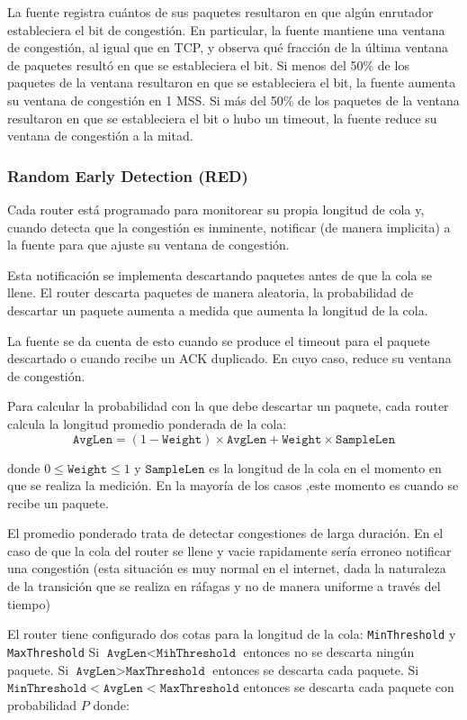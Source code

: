 La fuente registra cuántos de sus paquetes resultaron en que algún enrutador estableciera el bit de congestión. En particular, la fuente mantiene una ventana de congestión, al igual que en TCP, y observa qué fracción de la última ventana de paquetes resultó en que se estableciera el bit. Si menos del 50\% de los paquetes de la ventana resultaron en que se estableciera el bit, la fuente aumenta su ventana de congestión en 1 MSS. Si más del 50\% de los paquetes de la ventana resultaron en que se estableciera el bit o hubo un timeout, la fuente reduce su ventana de congestión a la mitad.

\subsubsection*{Random Early Detection (RED)}
Cada router está programado para monitorear su propia longitud de cola y, cuando detecta que la congestión es inminente, notificar (de manera implicita) a la fuente para que ajuste su ventana de congestión.

Esta notificación se implementa descartando paquetes antes de que la cola se llene. El router descarta paquetes de manera aleatoria, la probabilidad de descartar un paquete aumenta a medida que aumenta la longitud de la cola.

La fuente se da cuenta de esto cuando se produce el timeout para el paquete descartado o cuando recibe un ACK duplicado. En cuyo caso, reduce su ventana de congestión.

Para calcular la probabilidad con la que debe descartar un paquete, cada router calcula la longitud promedio ponderada de la cola:
\[
    \texttt{AvgLen} = (1 - \texttt{Weight}) \times \texttt{AvgLen} + \texttt{Weight} \times \texttt{SampleLen}
\]

donde \(0\leq \texttt{Weight} \leq 1\) y \(\texttt{SampleLen}\) es la longitud de la cola en el momento en que se realiza la medición. En la mayoría de los casos ,este momento es cuando se recibe un paquete.

El promedio ponderado trata de detectar congestiones de larga duración. En el caso de que la cola del router se llene y vacie rapidamente sería erroneo notificar una congestión (esta situación es muy normal en el internet, dada la naturaleza de la transición que se realiza en ráfagas y no de manera uniforme a través del tiempo)

El router tiene configurado dos cotas para la longitud de la cola: \texttt{MinThreshold} y \texttt{MaxThreshold}  Si \(\texttt{AvgLen} < \texttt{MihThreshold}\) entonces no se descarta ningún paquete. Si \(\texttt{AvgLen} > \texttt{MaxThreshold}\) entonces se descarta cada paquete. Si \(\texttt{MinThreshold} < \texttt{AvgLen} < \texttt{MaxThreshold}\) entonces se descarta cada paquete con probabilidad \(P\) donde:

